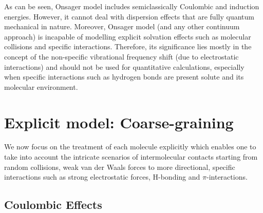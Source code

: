 \documentclass[a4paper,titlepage,twoside,fleqn,12pt]{book}
\begin{document}
\begin{refsection}
As can be seen, Onsager model includes semiclassically
Coulombic and induction energies. However, it cannot
deal with dispersion effects that are fully quantum mechanical
in nature. Moreover,
Onsager model (and any other continuum approach) 
is incapable of modelling
explicit solvation effects such as molecular collisions
and specific interactions. Therefore, its significance
lies mostly in the concept of the non\hyp{}specific
vibrational frequency shift (due to electrostatic
interactions) and should not be used for quantitative
calculations, especially when specific interactions such as
hydrogen bonds are present solute and its molecular environment.


\section{Explicit model: Coarse-graining\label{s:vibr-solv-explicit-models}}

We now focus on the treatment of each molecule
explicitly which enables one to take into account
the intricate scenarios of intermolecular contacts
starting from random collisions, weak van der Waals
forces to more directional, specific interactions
such as strong electrostatic forces, H-bonding and
$\pi$-interactions.

\subsection{Coulombic Effects\label{s:dw-coul}}


\end{refsection}
\end{document}
